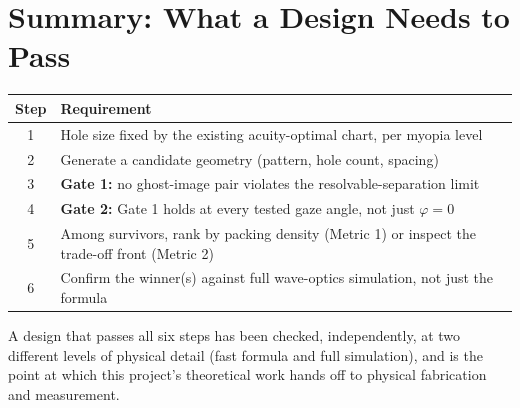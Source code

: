 \section{Summary: What a Design Needs to Pass}

\begin{center}
\begin{tabular}{cl}
\toprule
\textbf{Step} & \textbf{Requirement} \\
\midrule
1 & Hole size fixed by the existing acuity-optimal chart, per myopia level \\
2 & Generate a candidate geometry (pattern, hole count, spacing) \\
3 & \textbf{Gate 1:} no ghost-image pair violates the resolvable-separation limit \\
4 & \textbf{Gate 2:} Gate 1 holds at every tested gaze angle, not just $\varphi=0$ \\
5 & Among survivors, rank by packing density (Metric 1) or inspect the trade-off front (Metric 2) \\
6 & Confirm the winner(s) against full wave-optics simulation, not just the formula \\
\bottomrule
\end{tabular}
\end{center}

A design that passes all six steps has been checked, independently, at two
different levels of physical detail (fast formula and full simulation), and
is the point at which this project's theoretical work hands off to physical
fabrication and measurement.


